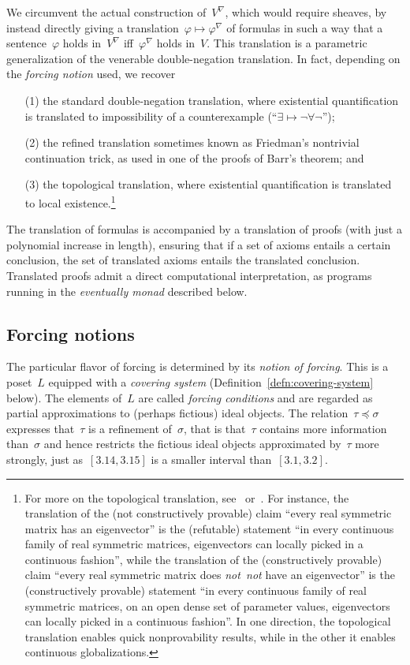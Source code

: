 \documentclass[com,11pt,crcready]{iosart2x}
\theoremstyle{definition}
\theoremstyle{plain}
\theoremstyle{remark}
\renewcommand{\_}{\mathpunct{.}\,}
\begin{document}
We circumvent the actual construction of~$V^\nabla$, which would require sheaves, by
instead directly giving a translation~$\varphi \mapsto \varphi^\nabla$ of
formulas in such a way that a sentence~$\varphi$ holds in~$V^\nabla$
iff~$\varphi^\nabla$ holds in~$V$. This translation is a parametric
generalization of the venerable double-negation translation. In fact, depending
on the \emph{forcing notion} used, we recover
\begin{enumerate}
\item[(1)] the standard double-negation translation, where
existential quantification is translated to impossibility of a counterexample
(``$\exists \mapsto \neg\forall\neg$'');
\item[(2)] the refined translation sometimes known as Friedman's nontrivial
continuation trick, as used in one of the proofs of Barr's theorem; and
\item[(3)] the topological translation, where existential quantification is
translated to local existence.\footnote{For more on the topological
translation, see~\cite[Section~4.3]{blechschmidt:filmat}
or~\cite[Section~2.4]{blechschmidt:generalized-spaces}. For instance, the
translation of the (not constructively provable) claim ``every real symmetric
matrix has an eigenvector'' is the (refutable) statement ``in every continuous
family of real symmetric matrices, eigenvectors can locally picked in a
continuous fashion'', while the translation of the (constructively provable)
claim ``every real symmetric matrix does \emph{not~not} have an eigenvector''
is the (constructively provable) statement ``in every continuous family of real
symmetric matrices, on an open dense set of parameter values, eigenvectors can
locally picked in a continuous fashion''. In one direction, the topological
translation enables quick nonprovability results, while in the other it enables
continuous globalizations.}
\end{enumerate}

The translation of formulas is accompanied by a translation of proofs (with
just a polynomial increase in length), ensuring that if a set of axioms
entails a certain conclusion, the set of translated axioms entails the
translated conclusion. Translated proofs admit a direct computational
interpretation, as programs running in the \emph{eventually monad} described
below.


\subsection{Forcing notions} The particular flavor of forcing is determined
by its \emph{notion of forcing}. This is a poset~$L$ equipped with a
\emph{covering system} (Definition~\ref{defn:covering-system} below). The
elements of~$L$ are called \emph{forcing conditions} and are regarded
as partial approximations to (perhaps fictious) ideal objects. The
relation~$\tau \preceq \sigma$ expresses that~$\tau$ is a
refinement of~$\sigma$, that is that~$\tau$ contains more information
than~$\sigma$ and hence restricts the fictious ideal objects
approximated by~$\tau$ more strongly, just as~$[3.14, 3.15]$ is a smaller
interval than~$[3.1, 3.2]$.
\end{document}
